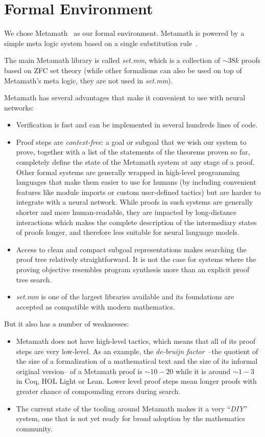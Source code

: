 \section{Formal Environment}

We chose Metamath~\cite{megill2019metamath} as our formal environment. Metamath is powered by a simple meta logic system based on a single substitution rule~\cite{megill2006how}.

The main Metamath library is called \textit{set.mm}, which is a collection of $\sim 38k$ proofs based on ZFC set theory (while other formalisms can also be used on top of Metamath's meta logic, they are not used in {\it set.mm}).

Metamath has several advantages that make it convenient to use with neural networks:

\begin{itemize}
  \item Verification is fast and can be implemented in several hundreds lines of code.
  \item Proof steps are \textit{context-free}: a goal or subgoal that we wish our system to prove, together with a list of the statements of the theorems proven so far, completely define the state of the Metamath system at any stage of a proof. Other formal systems are generally wrapped in high-level programming languages that make them easier to use for humans (by including convenient features like module imports or custom user-defined tactics) but are harder to integrate with a neural network. While proofs in such systems are generally shorter and more human-readable, they are impacted by long-distance interactions which makes the complete description of the intermediary states of proofs longer, and therefore less suitable for neural language models.
  \item Access to clean and compact subgoal representations makes searching the proof tree relatively straightforward. It is not the case for systems where the proving objective resembles program synthesis more than an explicit proof tree search.
  \item \textit{set.mm} is one of the largest libraries available and its foundations are accepted as compatible with modern mathematics.
\end{itemize}

But it also has a number of weaknesses:

\begin{itemize}
  \item Metamath does not have high-level tactics, which means that all of its proof steps are very low-level. As an example, the \textit{de-bruijn factor}~\cite{wiedijk2014debruijn}--the quotient of the size of a formalization of a mathematical text and the size of its informal original version-- of a Metamath proof is $\sim10-20$ while it is around $\sim1-3$ in Coq, HOL Light or Lean.  Lower level proof steps mean longer proofs with greater chance of compounding errors during search.
  \item The current state of the tooling around Metamath makes it a very ``\textit{DIY}'' system, one that is not yet ready for broad adoption by the mathematics community.
\end{itemize}

